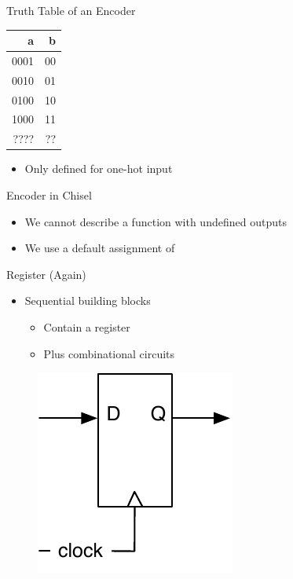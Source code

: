 \begin{frame}[fragile]{Truth Table of an Encoder}
\begin{table}
  \begin{tabular}{rr}
    \toprule
    a & b \\
    \midrule
    0001 & 00 \\
    0010 & 01 \\
    0100 & 10 \\
    1000 & 11 \\
    ???? & ?? \\
    \bottomrule 
  \end{tabular} 
\end{table}
\begin{itemize}
\item Only defined for one-hot input
\end{itemize}
\end{frame}

\begin{frame}[fragile]{Encoder in Chisel}
\begin{itemize}
\item We cannot describe a function with undefined outputs
\item We use a default assignment of 
\end{itemize}

\end{frame}

\begin{frame}[fragile]{Register (Again)}
\begin{itemize}
\item Sequential building blocks
\begin{itemize}
\item Contain a register
\item Plus combinational circuits
\end{itemize}
\end{itemize}
\begin{figure}
  \includegraphics[scale=\scale]{../figures/register}
\end{figure}
\end{frame}



